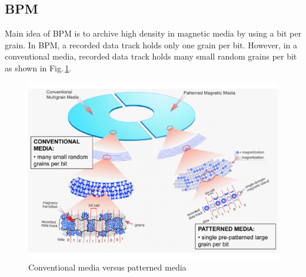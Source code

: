 \subsection{BPM}
Main idea of BPM is to archive high density in magnetic media by using a bit per grain. In BPM, a recorded data track holds only one grain per bit. However, in a conventional media, recorded data track holds many small random grains per bit as shown in Fig.\,\ref{fig_bpm}.
\begin{figure}[!hbt]
\includegraphics[height=0.25\textheight]{ieee_bpm}
\caption{Conventional media versus patterned media~\cite{IEEE_BPM}}
\label{fig_bpm}
\end{figure}